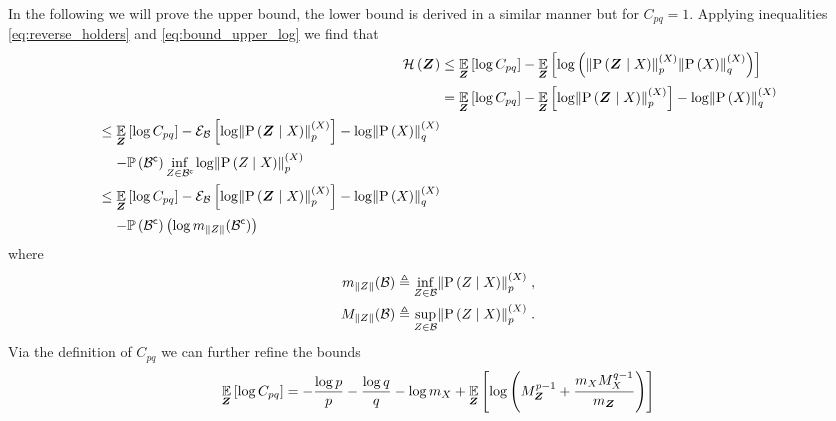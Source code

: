 \begin{proofE}
	In the following we will prove the upper bound, the lower bound is derived in a similar manner but for $C_{pq}=1$. Applying inequalities \eqref{eq:reverse_holders} and \eqref{eq:bound_upper_log} we find that
	\begin{align*}
		\entropy{\observationsRV{}} & \leq\expectation{\log C_{pq}}{\observationsRV{}} -\expectation{\log\left(\pnorm{\probcond{\observationsRV{}}{\states{}}}{p}{\states{}}\pnorm{\prob{\states{}}}{q}{\states{}}\right)}{\observationsRV{}} \\
		& =\expectation{\log C_{pq}}{\observationsRV{}}-\expectation{\log \pnorm{\probcond{\observationsRV{}}{\states{}}}{p}{\states{}}}{\observationsRV{}} -\log\pnorm{\prob{\states{}}}{q}{\states{}}           \\
		\begin{split}
			& \leq\expectation{\log C_{pq}}{\observationsRV{}} -\partialexpectation{\log \pnorm{\probcond{\observationsRV{}}{\states{}}}{p}{\states{}}}{\subSpace} -\log\pnorm{\prob{\states{}}}{q}{\states{}} \\
			& \phantomeq-\measure{\stcomp{\subSpace}}\inf_{\observations{}\in\stcomp{\subSpace}}\log \pnorm{\probcond{\observations{}}{\states{}}}{p}{\states{}}
		\end{split}                   \\
		\begin{split}
			& \leq \expectation{\log C_{pq}}{\observationsRV{}}-\partialexpectation{\log \pnorm{\probcond{\observationsRV{}}{\states{}}}{p}{\states{}}}{\subSpace} -\log\pnorm{\prob{\states{}}}{q}{\states{}} \\
			& \phantomeq-\measure{\stcomp{\subSpace}}\left(\log m_{\norm{\observations{}}}(\stcomp{\subSpace})\right)
		\end{split}
	\end{align*}
	where
	\begin{align*}
		m_{\norm{\observations{}}}(\subSpace) & \triangleq\inf_{\observations{}\in\subSpace}\pnorm{\probcond{\observations{}}{\states{}}}{p}{\states{}}\;,
		\\
		M_{\norm{\observations{}}}(\subSpace) & \triangleq\sup_{\observations{}\in\subSpace}\pnorm{\probcond{\observations{}}{\states{}}}{p}{\states{}}\;.
	\end{align*}
	Via the definition of $C_{pq}$ we can further refine the bounds
	\begin{align*}
		\expectation{\log C_{pq}}{\observationsRV{}} & = -\frac{\log p}{p}-\frac{\log q}{q}-\log m_{\states{}}+\expectation{\log \left(M_{\observationsRV{}}^{p-1}+\frac{m_{\states{}}M_{\states{}}^{q-1}}{m_{\observationsRV{}}}\right)}{\observationsRV{}}\\

\end{align*}
\end{proofE}
